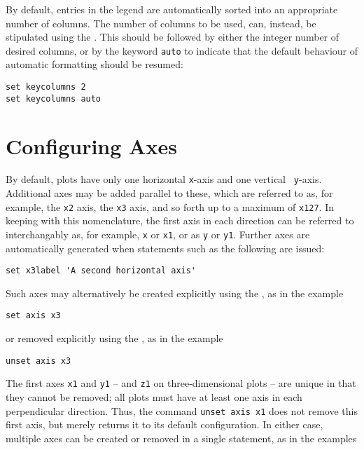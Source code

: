 By default, entries in the legend are automatically sorted into an appropriate
number of columns. The number of columns to be used, can, instead, be
stipulated using the . This should be followed by
either the integer number of desired columns, or by the keyword {\tt auto} to
indicate that the default behaviour of automatic formatting should be resumed:

\begin{verbatim}
set keycolumns 2
set keycolumns auto
\end{verbatim}

\section{Configuring Axes}
\label{sec:multiple_axes}

By default, plots have only one horizontal {\tt x}-axis and one vertical {\tt
y}-axis.  Additional axes may be added parallel to these, which are referred to
as, for example, the {\tt x2} axis, the {\tt x3} axis, and so forth up to a
maximum of {\tt x127}.  In keeping with this nomenclature, the first axis in
each direction can be referred to interchangably as, for example, {\tt x} or
{\tt x1}, or as {\tt y} or {\tt y1}.  Further axes are automatically generated
when statements such as the following are issued:

\begin{verbatim}
set x3label 'A second horizontal axis'
\end{verbatim}

\noindent Such axes may alternatively be created explicitly using the
, as in the example

\begin{verbatim}
set axis x3
\end{verbatim}

\noindent or removed explicitly using the , as in the
example

\begin{verbatim}
unset axis x3
\end{verbatim}

\noindent The first axes {\tt x1} and {\tt y1} -- and {\tt z1} on
three-dimensional plots -- are unique in that they cannot be removed; all plots
must have at least one axis in each perpendicular direction.  Thus, the command
{\tt unset axis x1} does not remove this first axis, but merely returns it to
its default configuration. In either case, multiple axes can be created or
removed in a single statement, as in the examples

